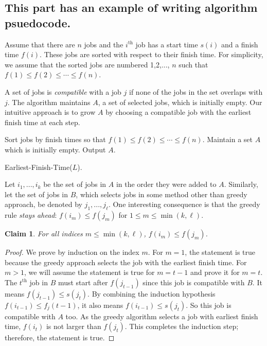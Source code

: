 \documentclass[11pt]{537homework}
\newtheorem{claim}[theorem]{Claim}
\newcommand{\ord}[2][th]{\ensuremath{{#2}^{\mathrm{#1}}}}
\begin{document}
\subsection{This part has an example of writing algorithm psuedocode.}
Assume that there are $n$ jobs and the $\ord{i}$ job has a
start time $s(i)$ and a finish time $f(i)$. These jobs are sorted with
respect to their finish time.
For simplicity, we assume that the sorted jobs are numbered 1,2,...,
$n$ such that $f(1)\leq f(2)\leq \cdots \leq f(n)$.

A set of jobs is \emph{compatible} with a job $j$
if none of the jobs in the set overlaps with $j$.
The algorithm maintains $A$, a set of selected jobs,
which is initially empty.
Our intuitive approach is to grow $A$ by choosing a compatible job
with the earliest finish time at each step.

\begin{algorithm}
\DontPrintSemicolon
{}
\BlankLine
\nl Sort jobs by finish times so that $f(1) \leq f(2) \leq \cdots \leq f(n)$.\;
\nl Maintain a set \(A\) which is initially empty.\;
\nl    {}
\nl Output $A$.
\caption{Earliest-Finish-Time(\(L\)).\label{alg:earliest-finish-time}}
\end{algorithm}



Let $i_1,...,i_k$ be the set of jobs in $A$ in the order they were
added to $A$. Similarly, let the set of jobs in $B$, which selects
jobs in some method other than greedy approach, be denoted by
$j_1,...,j_\ell$.
One interesting consequence is that the greedy rule \emph{stays ahead}:
$f(i_m)\leq f(j_m)$ for $1\leq m\leq \min(k, \ell)$.
\vspace{.1in}
\begin{claim}
  For all indices $m\leq \min(k,\ell)$, $f(i_m)\leq f(j_m)$.
  \label{claim:stay_ahead}
\end{claim}
\begin{proof}
  We prove by induction on the index $m$.
  For $m=1$, the statement is true because the greedy approach selects
  the job with the earliest finish time.
  For $m>1$, we will assume the statement is true for $m=t-1$ and
  prove it for $m=t$. The $\ord{t}$ job in $B$ must start after
  $f(j_{t-1})$ since this job is compatible with $B$. It means
  $f(j_{t-1})\leq s(j_t)$. By combining the induction hypothesis
  $f(i_{t-1})\leq f_j(t-1)$, it also means $f(i_{t-1})\leq s(j_t)$.
  So this job is compatible with $A$ too.
  As the greedy algorithm selects a job with earliest finish time,
  $f(i_t)$ is not larger than $f(j_t)$.
  This completes the induction step; therefore, the statement is true.
\end{proof}
\end{document}
